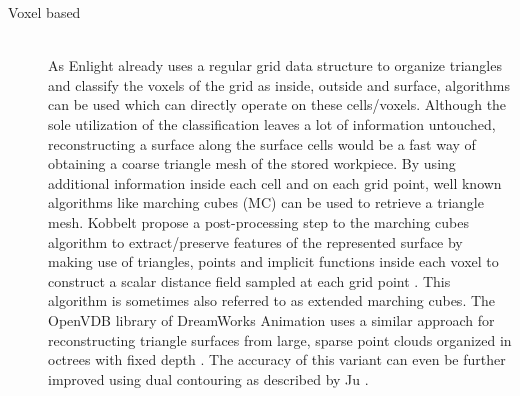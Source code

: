 \begin{description}
	\item[Voxel based] \hfill \\
	As Enlight already uses a regular grid data structure to organize triangles and classify the voxels of the grid as inside, outside and surface, algorithms can be used which can directly operate on these cells/voxels.
	Although the sole utilization of the classification leaves a lot of information untouched, reconstructing a surface along the surface cells would be a fast way of obtaining a coarse triangle mesh of the stored workpiece.
	By using additional information inside each cell and on each grid point, well known algorithms like marching cubes (MC) can be used to retrieve a triangle mesh.
	Kobbelt \etal propose a post-processing step to the marching cubes algorithm to extract/preserve features of the represented surface by making use of triangles, points and implicit functions inside each voxel to construct a scalar distance field sampled at each grid point \cite{extended_marching_cubes}.
	This algorithm is sometimes also referred to as extended marching cubes.
	The OpenVDB library of DreamWorks Animation uses a similar approach for reconstructing triangle surfaces from large, sparse point clouds organized in octrees with fixed depth \cite{openvdb}.
	The accuracy of this variant can even be further improved using dual contouring as described by Ju \etal \cite{dual_contouring}.
\end{description}
